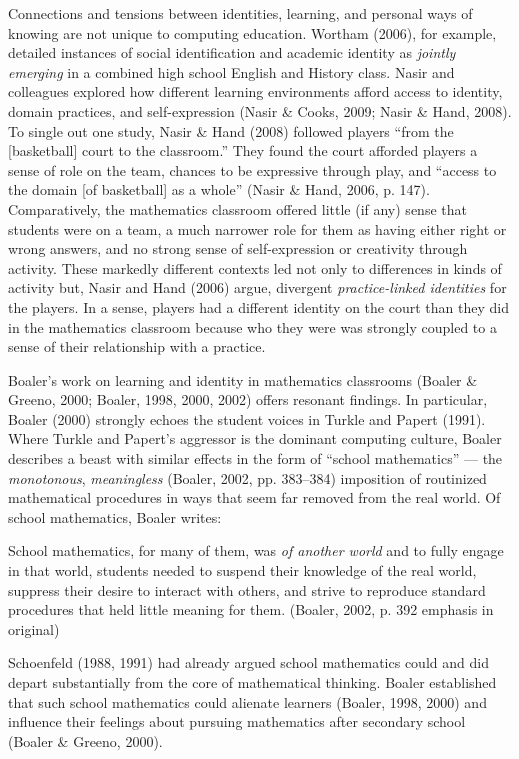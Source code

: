 Connections and tensions between identities, learning, and personal ways
of knowing are not unique to computing education. Wortham (2006), for
example, detailed instances of social identification and academic
identity as \emph{jointly emerging} in a combined high school English
and History class. Nasir and colleagues explored how different learning
environments afford access to identity, domain practices, and
self-expression (Nasir \& Cooks, 2009; Nasir \& Hand, 2008). To single
out one study, Nasir \& Hand (2008) followed players ``from the
{[}basketball{]} court to the classroom.'' They found the court afforded
players a sense of role on the team, chances to be expressive through
play, and ``access to the domain {[}of basketball{]} as a whole'' (Nasir
\& Hand, 2006, p. 147). Comparatively, the mathematics classroom offered
little (if any) sense that students were on a team, a much narrower role
for them as having either right or wrong answers, and no strong sense of
self-expression or creativity through activity. These markedly different
contexts led not only to differences in kinds of activity but, Nasir and
Hand (2006) argue, divergent \emph{practice-linked identities} for the
players. In a sense, players had a different identity on the court than
they did in the mathematics classroom because who they were was strongly
coupled to a sense of their relationship with a practice.

Boaler's work on learning and identity in mathematics classrooms (Boaler
\& Greeno, 2000; Boaler, 1998, 2000, 2002) offers resonant findings. In
particular, Boaler (2000) strongly echoes the student voices in Turkle
and Papert (1991). Where Turkle and Papert's aggressor is the dominant
computing culture, Boaler describes a beast with similar effects in the
form of ``school mathematics'' --- the \emph{monotonous},
\emph{meaningless} (Boaler, 2002, pp. 383--384) imposition of routinized
mathematical procedures in ways that seem far removed from the real
world. Of school mathematics, Boaler writes:

School mathematics, for many of them, was \emph{of another world} and to
fully engage in that world, students needed to suspend their knowledge
of the real world, suppress their desire to interact with others, and
strive to reproduce standard procedures that held little meaning for
them. (Boaler, 2002, p. 392 emphasis in original)

Schoenfeld (1988, 1991) had already argued school mathematics could and
did depart substantially from the core of mathematical thinking. Boaler
established that such school mathematics could alienate learners
(Boaler, 1998, 2000) and influence their feelings about pursuing
mathematics after secondary school (Boaler \& Greeno, 2000).

